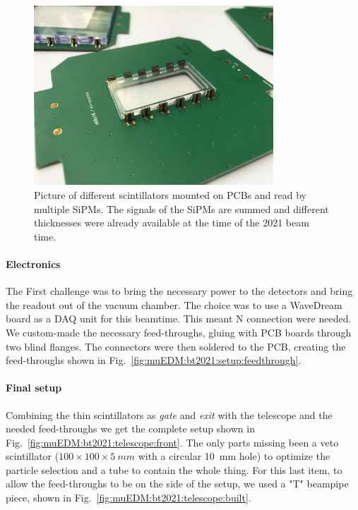 \begin{refsection}
        \begin{figure}
            \centering
            \includegraphics[width = 0.8\textwidth]{Figures/muEDM/thin_scintillators.jpg}
            \caption[muEDM: Thin scintillators for the beamtimes.]{Picture of different scintillators mounted on PCBs and read by multiple SiPMs. The signals of the SiPMs are summed and different thicknesses were already available at the time of the 2021 beam time.}
            \label{fig:muEDM:thin_scintillators}
        \end{figure}

        \paragraph{Electronics}
        The First challenge was to bring the necessary power to the detectors and bring the readout out of the vacuum chamber.
        The choice was to use a WaveDream board as a DAQ unit for this beamtime.
        This meant N connection were needed.
        We custom-made the necessary feed-throughs, gluing with \stycast PCB boards through two blind flanges.
        The connectors were then soldered to the PCB, creating the feed-throughs shown in Fig.~\ref{fig:muEDM:bt2021:setup:feedthrough}.
        
        \paragraph{Final setup}
        Combining the thin scintillators as \textit{gate} and \textit{exit} with the telescope and the needed feed-throughs we get the complete setup shown in Fig.~\ref{fig:muEDM:bt2021:telescope:front}.
        The only parts missing been a veto scintillator ($100\times 100\times\SI{5}{mm}$ with a circular \SI{10}{mm} hole) to optimize the particle selection and a tube to contain the whole thing.
        For this last item, to allow the feed-throughs to be on the side of the setup, we used a "T" beampipe piece, shown in Fig.~\ref{fig:muEDM:bt2021:telescope:built}.
        

\end{refsection}

